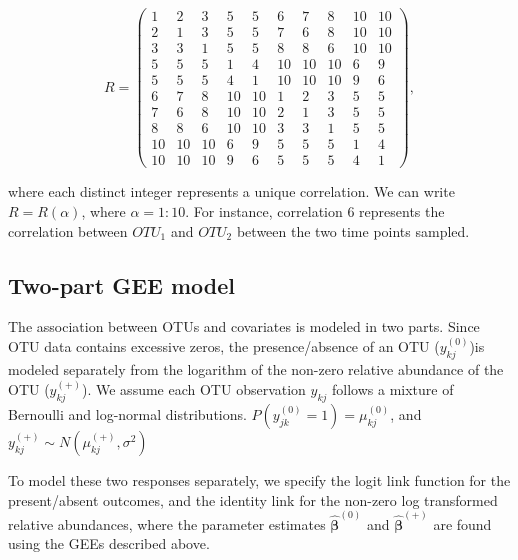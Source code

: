\documentclass[12pt]{article}
\begin{document}
\begin{singlespace}
$$R = \begin{pmatrix}
        1 & 2 & 3 & 5 & 5 &  6 & 7 & 8 & 10 & 10 \\
        2 & 1 & 3 & 5 & 5 & 7 & 6 & 8 & 10 & 10 \\
        3 & 3 & 1 & 5 & 5 & 8 & 8 & 6 & 10 & 10 \\
        5 & 5 & 5 & 1 & 4 & 10 & 10 & 10 & 6 & 9 \\
        5 & 5 & 5 & 4 & 1 & 10 & 10 & 10  & 9 & 6 \\
        6 & 7 & 8 & 10 & 10 & 1 & 2 & 3 & 5 & 5  \\
        7 & 6 & 8 & 10 & 10 & 2 & 1 & 3 & 5 & 5  \\
        8 & 8 & 6 & 10 & 10 & 3 & 3 & 1 & 5 & 5 \\
        10 & 10 & 10 & 6 & 9 & 5 & 5 & 5 & 1 & 4  \\
        10 & 10 & 10  & 9 & 6  & 5 & 5 & 5 & 4 & 1
  \end{pmatrix},$$
\end{singlespace}
where each distinct integer represents a unique correlation. We can write $R = R(\alpha)$, where $\alpha = 1:10$. For instance, correlation 6 represents the correlation between $OTU_1$ and $OTU_2$ between the two time points sampled.

\subsection{Two-part GEE model}

The association between OTUs and covariates is modeled in two parts. Since OTU data contains excessive zeros, the presence/absence of an OTU ($y_{kj}^{(0)}$)is modeled separately from the logarithm of the non-zero relative abundance of the OTU ($y_{kj}^{(+)}$). We assume each OTU observation $y_{kj}$ follows a mixture of Bernoulli and log-normal distributions. $P(y_{jk}^{(0)} = 1) = \mu_{kj}^{(0)}$, and $y_{kj}^{(+)} \sim N(\mu_{kj}^{(+)}, \sigma^2)$

%
%

To model these two responses separately, we specify the logit link function for the present/absent outcomes, and the identity link for the non-zero log transformed relative abundances, where the parameter estimates $\hat{\boldsymbol\beta}^{(0)}$ and $\hat{\boldsymbol\beta}^{(+)}$ are found using the GEEs described above.
\end{document}
